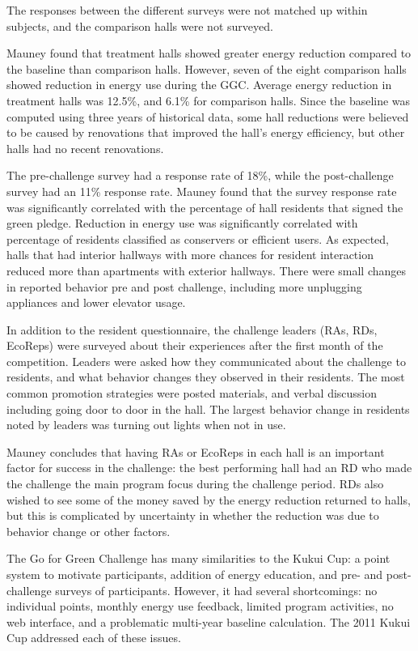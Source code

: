 The responses between the different surveys were not matched up within subjects, and the comparison halls were not surveyed.

Mauney found that treatment halls showed greater energy reduction compared to the baseline than comparison halls. However, seven of the eight comparison halls showed reduction in energy use during the GGC. Average energy reduction in treatment halls was 12.5\%, and 6.1\% for comparison halls. Since the baseline was computed using three years of historical data, some hall reductions were believed to be caused by renovations that improved the hall's energy efficiency, but other halls had no recent renovations.

The pre-challenge survey had a response rate of 18\%, while the post-challenge survey had an 11\% response rate. Mauney found that the survey response rate was significantly correlated with the percentage of hall residents that signed the green pledge. Reduction in energy use was significantly correlated with percentage of residents classified as conservers or efficient users. As expected, halls that had interior hallways with more chances for resident interaction reduced more than apartments with exterior hallways. There were small changes in reported behavior pre and post challenge, including more unplugging appliances and lower elevator usage.

In addition to the resident questionnaire, the challenge leaders (RAs, RDs, EcoReps) were surveyed about their experiences after the first month of the competition. Leaders were asked how they communicated about the challenge to residents, and what behavior changes they observed in their residents. The most common promotion strategies were posted materials, and verbal discussion including going door to door in the hall. The largest behavior change in residents noted by leaders was turning out lights when not in use.

Mauney concludes that having RAs or EcoReps in each hall is an important factor for success in the challenge: the best performing hall had an RD who made the challenge the main program focus during the challenge period. RDs also wished to see some of the money saved by the energy reduction returned to halls, but this is complicated by uncertainty in whether the reduction was due to behavior change or other factors.

The Go for Green Challenge has many similarities to the Kukui Cup: a point system to motivate participants, addition of energy education, and pre- and post-challenge surveys of participants. However, it had several shortcomings: no individual points, monthly energy use feedback, limited program activities, no web interface, and a problematic multi-year baseline calculation. The 2011 Kukui Cup addressed each of these issues.



